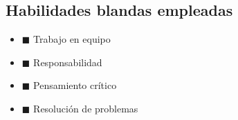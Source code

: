 \documentclass[11pt]{article}
\begin{document}
\subsection{Habilidades blandas empleadas}
\begin{itemize}
    \item[] $\blacksquare$ Trabajo en equipo
    \item[] $\blacksquare$ Responsabilidad
    \item[] $\blacksquare$ Pensamiento crítico
    \item[] $\blacksquare$ Resolución de problemas
\end{itemize}

\end{document}
